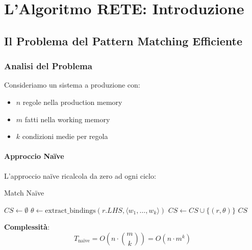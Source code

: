 
\chapter{L'Algoritmo RETE: Introduzione}
\label{cap:rete_intro}

\section{Il Problema del Pattern Matching Efficiente}

\subsection{Analisi del Problema}

Consideriamo un sistema a produzione con:
\begin{itemize}
\item $n$ regole nella production memory
\item $m$ fatti nella working memory
\item $k$ condizioni medie per regola
\end{itemize}

\subsubsection{Approccio Naïve}

L'approccio naïve ricalcola da zero ad ogni ciclo:

\begin{algorithm}[H]
\caption{Match Naïve}
\begin{algorithmic}[1]
    \State $CS \gets \emptyset$
                \State $\theta \gets \text{extract\_bindings}(r.LHS, \langle w_1, \ldots, w_k \rangle)$
                \State $CS \gets CS \cup \{(r, \theta)\}$
            \EndIf
        \EndFor
    \EndFor
    \State \Return $CS$
\EndFunction
\end{algorithmic}
\end{algorithm}

\textbf{Complessità}:
\begin{equation}
T_{\text{naïve}} = O\left(n \cdot \binom{m}{k}\right) = O(n \cdot m^k)
\end{equation}

